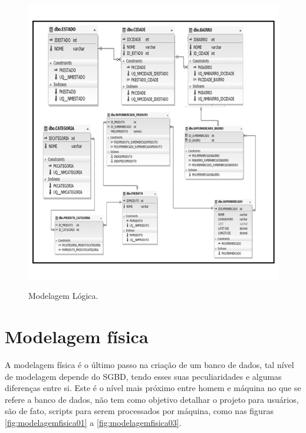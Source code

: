 \begin{figure}[H]
   	\centering
   	\caption{Modelagem Lógica.}
   	\includegraphics[scale=0.8]{Imagens/ModelagemLogica.png}
   	\label{fig:modelagemlogica}
\end{figure}
	
\section{Modelagem física}
	A modelagem física é o último passo na criação de um banco de dados, tal nível de modelagem depende do SGBD, tendo esses suas peculiaridades e algumas diferenças entre si. Este é o nível mais próximo entre homem e máquina no que se refere a banco de dados, não tem como objetivo detalhar o projeto para usuários, são de fato, scripts para serem processados por máquina, como nas figuras \ref{fig:modelagemfisica01} a \ref{fig:modelagemfisica03}.
	
